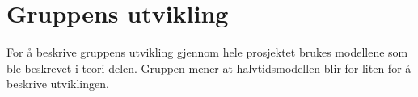 \chapter{Gruppens utvikling}

For å beskrive gruppens utvikling gjennom hele prosjektet brukes modellene som ble beskrevet i teori-delen. 
Gruppen mener at halvtidsmodellen blir for liten for å beskrive utviklingen. 
